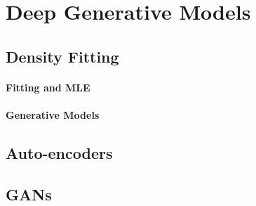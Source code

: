 
\section{Deep Generative Models}
\label{sec-deepnet-gen}


\subsection{Density Fitting}

\paragraph{Fitting and MLE}

\paragraph{Generative Models}

\subsection{Auto-encoders}

\subsection{GANs}

\fi